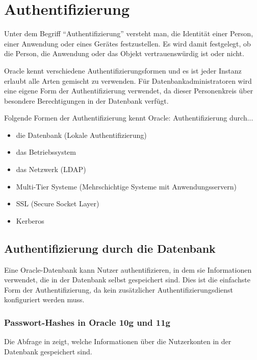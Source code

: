     \section{Authentifizierung}
      Unter dem Begriff \enquote{Authentifizierung} versteht man, die Identität einer Person, einer Anwendung oder eines Ge\-rä\-tes festzustellen. Es wird damit festgelegt, ob die Person, die Anwendung oder das Objekt vertrauenswürdig ist oder nicht.

      Oracle kennt verschiedene Authentifizierungsformen und es ist jeder Instanz erlaubt alle Arten gemischt zu verwenden. Für Datenbankadministratoren wird eine eigene Form der Authentifizierung verwendet, da dieser Personenkreis über besondere Berechtigungen in der Datenbank verfügt.

      Folgende Formen der Authentifizierung kennt Oracle: Authentifizierung durch...
      \begin{itemize}
        \item die Datenbank (Lokale Authentifizierung)
        \item das Betriebssystem
        \item das Netzwerk (LDAP)
        \item Multi-Tier Systeme (Mehrschichtige Systeme mit Anwendungsservern)
        \item SSL (Secure Socket Layer)
        \item Kerberos
      \end{itemize}
      \subsection{Authentifizierung durch die Datenbank}
        Eine Oracle-Datenbank kann Nutzer authentifizieren, in dem sie
        Informationen verwendet, die in der Datenbank selbst gespeichert sind.
        Dies ist die einfachste Form der Authentifizierung, da kein zusätzlicher
        Authentifizierungsdienst konfiguriert werden muss.
        \subsubsection{Passwort-Hashes in Oracle 10g und 11g}
        Die Abfrage in  zeigt, welche Informationen über
        die Nutzerkonten in der Datenbank gespeichert sind.

